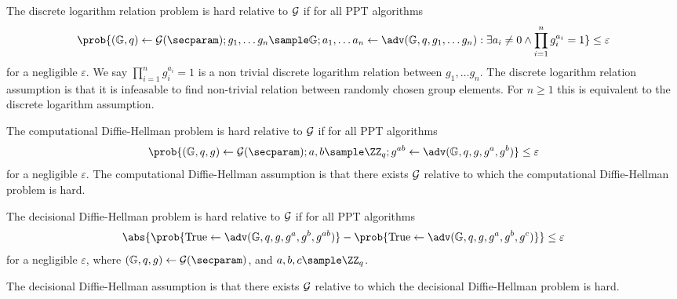 \begin{assumption}
The discrete logarithm relation problem is hard relative to $\mathcal{G}$ if for all \textsc{PPT} algorithms \adv
$$\prob{(\Group, q) \gets \setup(\secparam); g_1, \dots g_n \sample \Group; a_1, \dots a_n \gets \adv(\Group, q, g_1, \dots g_n): \exists a_i \neq 0 \wedge \prod_{i=1}^n g_i^{a_i} = 1} \leq \varepsilon $$
for a negligible $\varepsilon$. 
We say $\prod_{i=1}^n g_i^{a_i} = 1$ is a non trivial discrete logarithm relation between $g_1, \dots g_n$. 
The discrete logarithm relation assumption is that it is infeasable to find non-trivial relation between randomly chosen group elements. For $n \geq 1$ this is equivalent to the discrete logarithm assumption.
\end{assumption}

\begin{assumption}
The computational Diffie-Hellman problem is hard relative to $\mathcal{G}$ if for all \textsc{PPT} algorithms \adv
$$\prob{(\Group, q, g) \gets \setup(\secparam); a, b \sample \ZZ_q; g^{ab} \gets \adv(\Group, q, g, g^a, g^b)} \leq \varepsilon$$
for a negligible $\varepsilon$.
The computational Diffie-Hellman assumption is that there exists $\mathcal{G}$ relative to which the computational Diffie-Hellman problem is hard.
\end{assumption}

\begin{assumption}
The decisional Diffie-Hellman problem is hard relative to $\mathcal{G}$ if for all \textsc{PPT} algorithms \adv
$$ \abs{ \prob{\text{True} \gets \adv(\Group, q, g, g^a, g^b, g^{ab})} - \prob{\text{True} \gets \adv(\Group, q, g, g^a, g^b, g^c)} } \leq \varepsilon $$
for a negligible $\varepsilon$, 
where $(\Group, q, g) \gets \setup(\secparam)$, and $a, b, c \sample \ZZ_q$.

The decisional Diffie-Hellman assumption is that there exists $\mathcal{G}$ relative to which the decisional Diffie-Hellman problem is hard.
\end{assumption}

